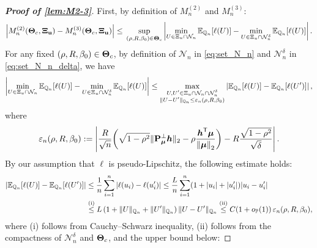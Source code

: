 \begin{proof}[\textbf{Proof of \cref{lem:M2-3}}]
    First, by definition of $M_n^{(2)}$ and $M_n^{(3)}$:
    \begin{equation*}
        \left|{ M_n^{(2)}(\text{\boldmath $\Theta$}_{c}, \text{\boldmath $\Xi$}_{\mathrm{\bf u}}) - M_n^{(3)}(\text{\boldmath $\Theta$}_{c}, \text{\boldmath $\Xi$}_{\mathrm{\bf u}}) }\right| \le \, \sup_{(\rho, R, \beta_0) \in \text{\boldmath $\Theta$}_{c}}
            \left|{ 
            \min_{  
                U \in \Xi_{u}  \cap   \mathcal{N}_n  }
                \mathbb{E}_{\mathbb{Q}_n}[\ell(U)]    
        -
        \min_{  
        U \in \Xi_{u}  \cap   \mathcal{N}^\delta_n  }
        \mathbb{E}_{\mathbb{Q}_n}[\ell(U)]
        }\right|.
    \end{equation*}
    For any fixed $(\rho, R, \beta_0) \in \text{\boldmath $\Theta$}_{c}$, by definition of $\mathcal{N}_n$ in \cref{eq:set_N_n} and $\mathcal{N}^\delta_n$ in \cref{eq:set_N_n_delta}, we have
    \begin{equation*}
        \left\vert \min_{U \in \Xi_{u} \cap \mathcal{N}_n} \mathbb{E}_{\mathbb{Q}_n}[\ell(U)] - \min_{U \in \Xi_{u} \cap \mathcal{N}^\delta_n}
        \mathbb{E}_{\mathbb{Q}_n}[\ell(U)] \right\vert
        \le  
        \max_{\substack{ U, U' \in \Xi_u \cap \mathcal{N}_n \cap \mathcal{N}^\delta_n \\ 
        \| U - U' \|_{\mathbb{Q}_n} \le \varepsilon_n (\rho, R, \beta_0)}} \left\vert \mathbb{E}_{\mathbb{Q}_n} [\ell(U)] - \mathbb{E}_{\mathbb{Q}_n} [\ell(U')] \right\vert,
    \end{equation*}
    where
    \begin{equation*}
        \varepsilon_n (\rho, R, \beta_0) := \left\vert \frac{R}{\sqrt{n}} \biggl( \sqrt{1 - \rho^2}  \| \mathrm{\bf P}_{\text{\boldmath $\mu$}}^\perp \text{\boldmath $h$} \|_2  -  \rho\frac{\text{\boldmath $h$}^{\sf T} {\boldsymbol{\mu}}}{\left\|{{\boldsymbol{\mu}}}\right\|_2}  \biggr) - R \frac{\sqrt{1 - \rho^2}}{\sqrt{\delta}} \right\vert.
    \end{equation*}
    By our assumption that $\ell$ is pseudo-Lipschitz, the following estimate holds:
    \begin{align*}
        \left\vert \mathbb{E}_{\mathbb{Q}_n} [\ell(U)] - \mathbb{E}_{\mathbb{Q}_n} [\ell(U')] \right\vert 
        & \le 
        \frac{1}{n} \sum_{i=1}^{n} \vert \ell(u_i) - \ell(u'_i) \vert 
        \le \frac{L}{n} \sum_{i=1}^{n} (1 + \vert u_i \vert + \vert u'_i \vert ) \vert u_i - u'_i \vert \\
        & \stackrel{\text{(i)}}{\le}  L \left( 1 + \|U\|_{\mathbb{Q}_n} + \|U'\|_{\mathbb{Q}_n} \right) \|U - U'\|_{\mathbb{Q}_n} 
        \stackrel{\text{(ii)}}{\le}
        C ( 1 + o_{\mathbb{P}}(1) ) \, \varepsilon_n (\rho, R, \beta_0) ,
    \end{align*}
    where (i) follows from Cauchy--Schwarz inequality, (ii) follows from the compactness of $\mathcal{N}_n^\delta$ and $\text{\boldmath $\Theta$}_{c}$, and the upper bound below:

\end{proof}
